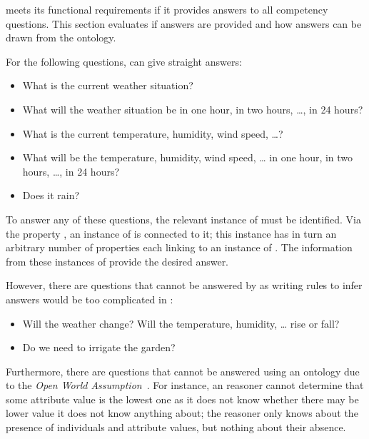 \smarthomeweather meets its functional requirements if it provides answers to all competency questions. This section evaluates if answers are provided and how answers can be drawn from the ontology.

For the following questions, \smarthomeweather can give straight answers:
\begin{itemize}
  \item What is the current weather situation?
  \item What will the weather situation be in one hour, in two hours, …, in 24 hours?
  \item What is the current temperature, humidity, wind speed, …?
  \item What will be the temperature, humidity, wind speed, … in one hour, in two hours, …, in 24 hours?
  \item Does it rain?
\end{itemize}
To answer any of these questions, the relevant instance of  must be identified. Via the property , an instance of  is connected to it; this instance has in turn an arbitrary number of  properties each linking to an instance of . The information from these instances of  provide the desired answer.

However, there are questions that cannot be answered by \smarthomeweather as writing rules to infer answers would be too complicated in :
\begin{itemize}
  \item Will the weather change? Will the temperature, humidity, … rise or fall?
  \item Do we need to irrigate the garden?
\end{itemize}

Furthermore, there are questions that cannot be answered using an  ontology due to the \emph{Open World Assumption}~\cite{open_world_assumption1}. For instance, an  reasoner cannot determine that some attribute value is the lowest one as it does not know whether there may be lower value it does not know anything about; the reasoner only knows about the presence of individuals and attribute values, but nothing about their absence.

